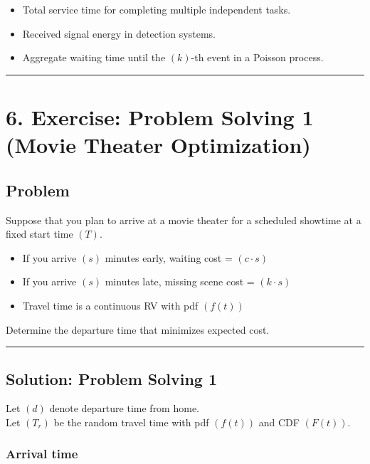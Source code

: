 \documentclass[12pt]{article}
\begin{document}
\begin{itemize}
    \item Total service time for completing multiple independent tasks.
    \item Received signal energy in detection systems.
    \item Aggregate waiting time until the $(k)$-th event in a Poisson process.
\end{itemize}

\hrule
\vspace{1em}

\section*{\textbf{6. Exercise: Problem Solving 1 (Movie Theater Optimization)}}

\subsection*{\textbf{Problem}}

Suppose that you plan to arrive at a movie theater for a scheduled showtime at a fixed start time $(T)$.

\begin{itemize}
    \item If you arrive $(s)$ minutes early, waiting cost = $(c\cdot s)$
    \item If you arrive $(s)$ minutes late, missing scene cost = $(k\cdot s)$
    \item Travel time is a continuous RV with pdf $(f(t))$
\end{itemize}

Determine the departure time that minimizes expected cost.

\hrule
\vspace{1em}

\subsection*{\textbf{Solution: Problem Solving 1}}

Let $(d)$ denote departure time from home.\\
Let $(T_r)$ be the random travel time with pdf $(f(t))$ and CDF $(F(t))$.

\subsubsection*{\textbf{Arrival time}}
\end{document}
